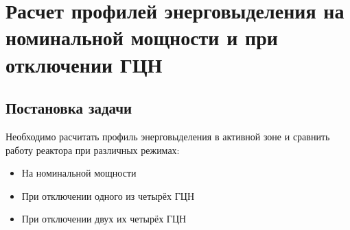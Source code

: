 \section{Расчет профилей энерговыделения на номинальной мощности и при отключении ГЦН}

\subsection{Постановка задачи}
Необходимо расчитать профиль энерговыделения в активной зоне и сравнить работу реактора при различных режимах:
\begin{itemize}
    \item На номинальной мощности
    \item При отключении одного из четырёх ГЦН
    \item При отключении двух их четырёх ГЦН
\end{itemize}

